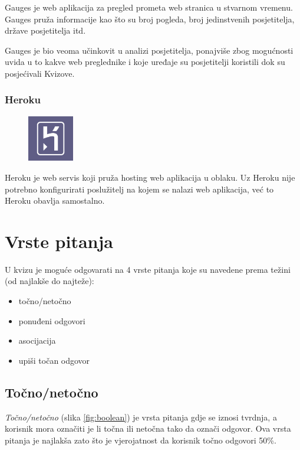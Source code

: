 \documentclass[11pt]{scrreprt}
\begin{document}
Gauges je web aplikacija za pregled prometa web stranica u stvarnom vremenu.
Gauges pruža informacije kao što su broj pogleda, broj jedinstvenih
posjetitelja, države posjetitelja itd.\cite{gauges}

Gauges je bio veoma učinkovit u analizi posjetitelja, ponajviše zbog mogućnosti
uvida u to kakve web preglednike i koje uređaje su posjetitelji koristili dok
su posjećivali Kvizove.

\subsubsection{Heroku}

\begin{figure}
  \vspace{-10pt}
  \includegraphics[width=2cm]{logos/heroku}
  \vspace{-30pt}
\end{figure}

Heroku je web servis koji pruža hosting web aplikacija u oblaku.\cite{heroku}
Uz Heroku nije potrebno konfigurirati poslužitelj na kojem se nalazi web
aplikacija, već to Heroku obavlja samostalno.

\section{Vrste pitanja}

U kvizu je moguće odgovarati na 4 vrste pitanja koje su navedene prema težini
(od najlakše do najteže):

\begin{itemize}
  \item točno/netočno
  \item ponuđeni odgovori
  \item asocijacija
  \item upiši točan odgovor
\end{itemize}

\subsection{Točno/netočno}

\emph{Točno/netočno} (slika \ref{fig:boolean}) je vrsta pitanja gdje se iznosi
tvrdnja, a korisnik mora označiti je li točna ili netočna tako da označi
odgovor. Ova vrsta pitanja je najlakša zato što je vjerojatnost da korisnik
točno odgovori 50\%.
\end{document}

